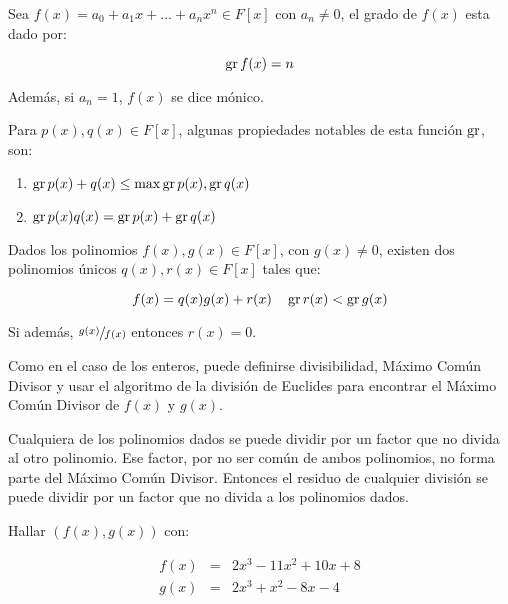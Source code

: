         \begin{definicion}
            Sea $f(x) = a_0 + a_1 x + \dots + a_n x^n \in F[x]$ con $a_n \ne 0$, el grado de $f(x)$ esta dado por:

            \begin{equation}
                \operatorname{gr}{f(x)} = n
            \end{equation}

            Además, si $a_n = 1$, $f(x)$ se dice mónico.

            Para $p(x), q(x) \in F[x]$, algunas propiedades notables de esta función $\operatorname{gr}$, son:

            \begin{enumerate}
                \item $\operatorname{gr}{p(x) + q(x)} \leq \max{\operatorname{gr}{p(x)}, \operatorname{gr}{q(x)}}$
                \item $\operatorname{gr}{p(x)q(x)} = \operatorname{gr}{p(x)} + \operatorname{gr}{q(x)}$
            \end{enumerate}
        \end{definicion}

        \begin{observacion}
            Dados los polinomios $f(x), g(x) \in F[x]$, con $g(x) \ne 0$, existen dos polinomios únicos $q(x), r(x) \in F[x]$ tales que:

            \begin{equation}
                f(x) = q(x) g(x) + r(x) \quad \operatorname{gr}{r(x)} < \operatorname{gr}{g(x)}
            \end{equation}

            Si además, $\sfrac{g(x)}{f(x)}$ entonces $r(x) = 0$.

            Como en el caso de los enteros, puede definirse divisibilidad, Máximo Común Divisor y usar el algoritmo de la división de Euclides para encontrar el Máximo Común Divisor de $f(x)$ y $g(x)$.

            Cualquiera de los polinomios dados se puede dividir por un factor que no divida al otro polinomio.
            Ese factor, por no ser común de ambos polinomios, no forma parte del Máximo Común Divisor.
            Entonces el residuo de cualquier división se puede dividir por un factor que no divida a los polinomios dados.
        \end{observacion}

        \begin{ejemplo}
            Hallar $(f(x), g(x))$ con:

            \begin{eqnarray*}
                f(x) & = & 2 x^3 - 11 x^2 + 10 x + 8 \\
                g(x) & = & 2 x^3 + x^2 - 8 x - 4
            \end{eqnarray*}
        \end{ejemplo}

